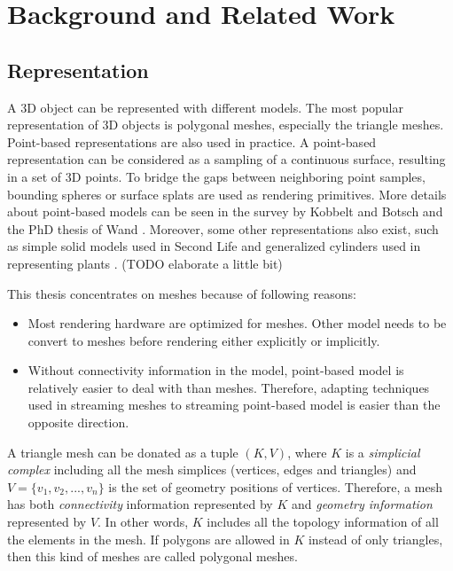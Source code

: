 \chapter{Background and Related Work}
\label{c:related}
    \section{Representation}
    \label{s:related:representation}
    A 3D object can be represented with different models.
    The most popular representation of 3D objects is polygonal meshes, 
    especially the triangle meshes.
    Point-based representations are also used in practice.
    A point-based representation can be considered as a 
    sampling of a continuous surface, resulting in a set of 3D points. 
    To bridge the gaps between neighboring point samples, 
    bounding spheres \cite{rusinkiewicz:qsplat, 364350} or surface splats \cite{383300} are used as rendering primitives. 
    More details about point-based models can be seen in the survey by Kobbelt and Botsch \cite{DBLP:journals/cg/KobbeltB04} 
    and the PhD thesis of Wand \cite{wand:point}.  
    Moreover, some other representations also exist, such as simple solid models used in Second Life
    and generalized cylinders used in representing plants \cite{plant:seb, compact:mondet}.
    (TODO elaborate a little bit)

    This thesis concentrates on meshes because of following reasons:
    \begin{itemize}
        \item Most rendering hardware are optimized for meshes. Other model needs to be convert
            to meshes before rendering either explicitly or implicitly. 
        \item Without connectivity information in the model, point-based model is relatively easier to deal with
            than meshes. Therefore, adapting techniques used in streaming meshes to streaming point-based model
            is easier than the opposite direction.
    \end{itemize}
    
    A triangle mesh can be donated as a tuple $(K, V)$, where $K$ is a
    \emph{simplicial complex} including all the mesh simplices 
    (vertices, edges and triangles) and $V =\{v_{1}, v_{2}, ...,
    v_{n}\}$ is the set of geometry positions of vertices. Therefore,
    a mesh has both \emph{connectivity} information represented by $K$
    and \emph{geometry information} represented by $V$. In other
    words, $K$ includes all the topology information of all the
    elements in the mesh. If
    polygons are allowed in $K$ instead of only triangles, then this
    kind of meshes are called polygonal meshes.

